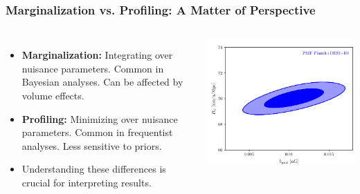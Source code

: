 \documentclass[aspectratio=169]{beamer}
\begin{document}
\begin{frame}
    \frametitle{Marginalization vs. Profiling: A Matter of Perspective}
    \begin{columns}
        \begin{itemize}
            \item \textbf{Marginalization:} Integrating over nuisance parameters. Common in Bayesian analyses.  Can be affected by volume effects.
            \item \textbf{Profiling:} Minimizing over nuisance parameters. Common in frequentist analyses. Less sensitive to priors.
            \item Understanding these differences is crucial for interpreting results. 
        \end{itemize}
        \includegraphics[width=\textwidth]{figures/PMF_MCMC.pdf}
    \end{columns}
\end{frame}
\end{document}
